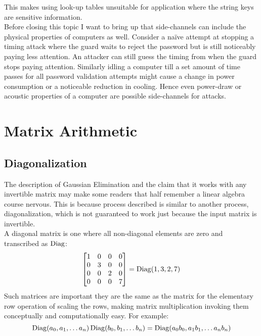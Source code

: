 This makes using look-up tables unsuitable for application where the string keys are sensitive information.
\\

Before closing this topic I want to bring up that side-channels can include the physical properties of computers as well.
Consider a naïve attempt at stopping a timing attack where the guard waits to reject the password but is still noticeably paying less attention.
An attacker can still guess the timing from when the guard stops paying attention.
Similarly idling a computer till a set amount of time passes for all password validation attempts might cause a change in power consumption or a noticeable reduction in cooling. 
Hence even power-draw or acoustic properties of a computer are possible side-channels for attacks.

\section{Matrix Arithmetic}
\subsection{Diagonalization}
The description of Gaussian Elimination and the claim that it works with any invertible matrix may make some readers that half remember a linear algebra course nervous.
This is because process described is similar to another process, diagonalization, which is not guaranteed to work just because the input matrix is invertible.
\\

A diagonal matrix is one where all non-diagonal elements are zero and transcribed as $\operatorname{Diag}$:
\[\begin{bmatrix}1&0&0&0\\0&3&0&0\\0&0&2&0\\0&0&0&7\end{bmatrix} = \operatorname{Diag}(1,3,2,7)\]
Such matrices are important they are the same as the matrix for the elementary row operation of scaling the rows,
making matrix multiplication invoking them conceptually and computationally easy.
For example:
\[\operatorname{Diag}(a_0,a_1,\dots a_n)\operatorname{Diag}(b_0,b_1,\dots b_n) = \operatorname{Diag}(a_0b_0,a_1b_1,\dots a_nb_n)\]
\\

